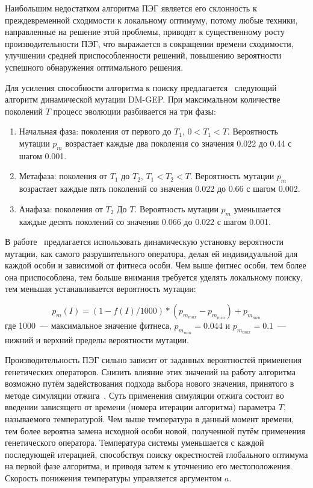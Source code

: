 Наибольшим недостатком алгоритма ПЭГ является его склонность к преждевременной сходимости к локальному оптимуму, потому любые техники, направленные на решение этой проблемы, приводят к существенному росту производительности ПЭГ, что выражается в сокращении времени сходимости, улучшении средней приспособленности решений, повышению вероятности успешного обнаружения оптимального решения.

Для усиления способности алгоритма к поиску предлагается~\cite{2008acat.confE.66T} следующий алгоритм динамической мутации DM-GEP. При максимальном количестве поколений $T$ процесс эволюции разбивается на три фазы:
\begin{enumerate}
  \item Начальная фаза: поколения от первого до $T_1$, $0 < T_1 < T$. Вероятность мутации $p_m$ возрастает каждые два поколения со значения 0.022 до 0.44 с шагом 0.001.
  \item Метафаза: поколения от $T_1$ до $T_2$, $T_1 < T_2 < T$. Вероятность мутации $p_m$ возрастает каждые пять поколений со значения 0.022 до 0.66 с шагом 0.002.
  \item Анафаза: поколения от $T_2$ До $T$. Вероятность мутации $p_m$ уменьшается каждые десять поколений со значения 0.066 до 0.022 с шагом 0.001.
\end{enumerate}

В работе~\cite{conf/dews/Tang06} предлагается использовать динамическую установку вероятности мутации, как самого разрушительного оператора, делая ей индивидуальной для каждой особи и зависимой от фитнеса особи. Чем выше фитнес особи, тем более она приспособлена, тем больше внимания требуется уделять локальному поиску, тем меньшая устанавливается вероятность мутации:

\begin{equation}
\label{eq:dynaminc_mutation_probability}
p_m(I) = (1 - f(I) / 1000)*(p_{m_{max}} - p_{m_{min}})+p_{m_{min}}
\end{equation}
где 1000~--- максимальное значение фитнеса, $p_{m_{min}}=0.044$ и $p_{m_{max}}=0.1$~--- нижний и верхний пределы вероятности мутации.

Производительность ПЭГ сильно зависит от заданных вероятностей применения генетических операторов. Снизить влияние этих значений на работу алгоритма возможно путём задействования подхода выбора нового значения, принятого в методе симуляции отжига~\cite{Siwei:2005:pICWCNMC}. Суть применения симуляции отжига состоит во введении зависящего от времени (номера итерации алгоритма) параметра $T$, называемого температурой. Чем выше температура в данный момент времени, тем более вероятна замена исходной особи новой, полученной путём применения генетического оператора. Температура системы уменьшается с каждой последующей итерацией, способствуя поиску окрестностей глобального оптимума на первой фазе алгоритма, и приводя затем к уточнению его местоположения. Скорость понижения температуры управляется аргументом $a$.

